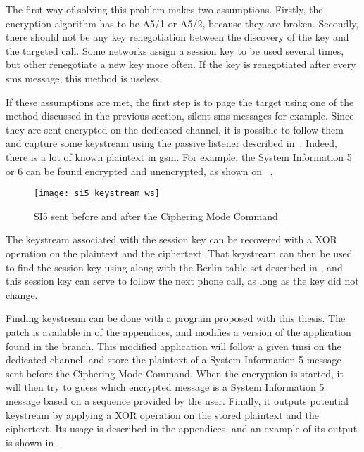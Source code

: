       The first way of solving this problem makes two assumptions.
      Firstly, the encryption algorithm has to be A5/1 or A5/2, because
      they are broken. Secondly, there should not be any key
      renegotiation between the discovery of the key and the targeted
      call. Some networks assign a session key to be used several times,
      but other renegotiate a new key more often. If the key is
      renegotiated after every \gls{sms} message, this method is
      useless.

      If these assumptions are met, the first step is to page the target
      using one of the method discussed in the previous section, silent
      \gls{sms} messages for example. Since they are sent encrypted on
      the dedicated channel, it is possible to follow them and capture
      some keystream using the passive listener described
      in~. Indeed, there is a lot of known
      plaintext in \gls{gsm}. For example, the System Information 5 or 6
      can be found encrypted and unencrypted, as shown on
      ~\cite{nohl_gsm:_2009}.

        \begin{figure}
          \centering
          \texttt{[image: si5\_keystream\_ws]}
          \caption{SI5 sent before and after the Ciphering Mode Command}
          \label{fig:si5_keystream_ws}
        \end{figure}

      The keystream associated with the session key can be recovered
      with a XOR operation on the plaintext and the ciphertext. That
      keystream can then be used to find the session key using
       along with the Berlin table set described in
      , and this session key can serve to follow the
      next phone call, as long as the key did not change.

      Finding keystream can be done with a program proposed with this
      thesis. The patch is available in  of the
      appendices, and modifies a version of the 
      application found in the  branch. This
      modified application will follow a given \gls{tmsi} on the
      dedicated channel, and store the plaintext of a System Information
      5 message sent before the Ciphering Mode Command. When the
      encryption is started, it will then try to guess which encrypted
      message is a System Information 5 message based on a sequence
      provided by the user. Finally, it outputs potential keystream by
      applying a XOR operation on the stored plaintext and the
      ciphertext. Its usage is described in the appendices, and an
      example of its output is shown in .

